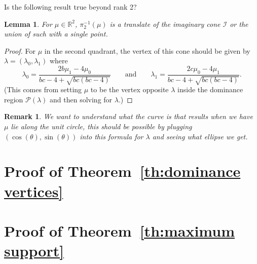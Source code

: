 \documentclass{amsart}
\newtheorem{lemma}[theorem]{Lemma}
\newtheorem{remark}[theorem]{Remark}
\numberwithin{theorem}{section}
\newcommand{\cI}{\mathcal{I}}
\newcommand{\cP}{\mathcal{P}}
\newcommand{\RR}{\mathbb{R}}
\begin{document}
  Is the following result true beyond rank 2?
  \begin{lemma}
    For $\mu\in\RR^2$, $\pi_2^{-1}(\mu)$ is a translate of the imaginary cone $\cI$ or the union of such with a single point.
  \end{lemma}
  \begin{proof}
    For $\mu$ in the second quadrant, the vertex of this cone should be given by $\lambda=(\lambda_0,\lambda_1)$ where
    \[\lambda_0=\frac{2b\mu_1-4\mu_0}{bc-4+\sqrt{bc(bc-4)}} \qquad \text{and} \qquad \lambda_1=\frac{2c\mu_0-4\mu_1}{bc-4+\sqrt{bc(bc-4)}}.\]
    (This comes from setting $\mu$ to be the vertex opposite $\lambda$ inside the dominance region $\cP(\lambda)$ and then solving for $\lambda$.)
  \end{proof}
  \begin{remark}
    We want to understand what the curve is that results when we have $\mu$ lie along the unit circle, this should be possible by plugging $(\cos(\theta),\sin(\theta))$ into this formula for $\lambda$ and seeing what ellipse we get.
  \end{remark}


\section{Proof of Theorem~\ref{th:dominance vertices}}


\section{Proof of Theorem~\ref{th:maximum support}}
\end{document}
